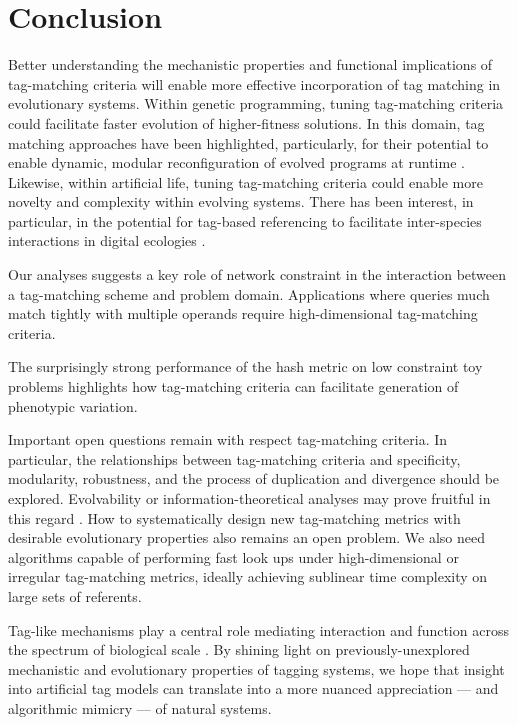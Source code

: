 \section{Conclusion}

Better understanding the mechanistic properties and functional implications of tag-matching criteria will enable more effective incorporation of tag matching in evolutionary systems.
Within genetic programming, tuning tag-matching criteria could facilitate faster evolution of higher-fitness solutions.
In this domain, tag matching approaches have been highlighted, particularly, for their potential to enable dynamic, modular reconfiguration of evolved programs at runtime \citep{spector2011tag,lalejini2021tag}.
Likewise, within artificial life, tuning tag-matching criteria could enable more novelty and complexity within evolving systems.
There has been interest, in particular, in the potential for tag-based referencing to facilitate inter-species interactions in digital ecologies \citep{dolson2021review}.

Our analyses suggests a key role of network constraint in the interaction between a tag-matching scheme and problem domain.
Applications where queries much match tightly with multiple operands require high-dimensional tag-matching criteria.

The surprisingly strong performance of the hash metric on low constraint toy problems highlights how tag-matching criteria can facilitate generation of phenotypic variation.

Important open questions remain with respect tag-matching criteria.
In particular, the relationships between tag-matching criteria and specificity, modularity, robustness, and the process of duplication and divergence should be explored.
Evolvability or information-theoretical analyses may prove fruitful in this regard \citep{tarapore2015evolvability}.
How to systematically design new tag-matching metrics with desirable evolutionary properties also remains an open problem.
We also need algorithms capable of performing fast look ups under high-dimensional or irregular tag-matching metrics, ideally achieving sublinear time complexity on large sets of referents.

Tag-like mechanisms play a central role mediating interaction and function across the spectrum of biological scale \citep{holland2012signals}.
By shining light on previously-unexplored mechanistic and evolutionary properties of tagging systems, we hope that insight into artificial tag models can translate into a more nuanced appreciation --- and algorithmic mimicry --- of natural systems.
